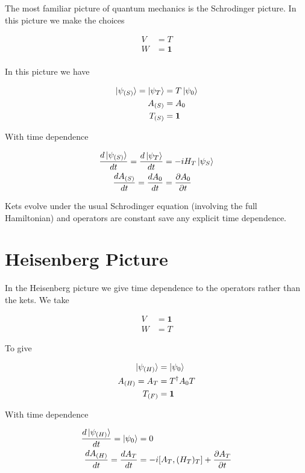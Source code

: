 \documentclass[12pt]{article}
\newcommand{\ddt}[1]{\frac{d #1}{dt}}
\newcommand{\ppt}[1]{\frac{\partial #1}{\partial t}}
\newcommand{\bv}[1]{\boldsymbol{#1}}
\begin{document}
The most familiar picture of quantum mechanics is the Schrodinger picture. In this picture we make the choices

\begin{align}
V &= T\\
W &= \bv{1}\\
\end{align}

In this picture we have

\begin{align}
\ket{\psi_{(S)}} = \ket{\psi_T} &= T \ket{\psi_0}\\
A_{(S)} &= A_0\\
T_{(S)} &= \bv{1}
\end{align}

With time dependence

\begin{align}
\ddt{\ket{\psi_{(S)}}} = \ddt{\ket{\psi_T}} &= -i H_T \ket{\psi_S}\\
\ddt{A_{(S)}} = \ddt{A_0} &= \ppt{A_0}
\end{align}

Kets evolve under the usual Schrodinger equation (involving the full Hamiltonian) and operators are constant save any explicit time dependence.

\section{Heisenberg Picture}

In the Heisenberg picture we give time dependence to the operators rather than the kets. We take

\begin{align}
V &= \bv{1}\\
W &= T
\end{align}

To give

\begin{align}
\ket{\psi_{(H)}} &= \ket{\psi_0}\\
A_{(H)} = A_T &= T^{\dag} A_0 T\\
T_{(F)} &= \bv{1}
\end{align}

With time dependence

\begin{align}
\ddt{\ket{\psi_{(H)}}} = \ket{\psi_0} &= 0\\
\ddt{A_{(H)}} = \ddt{A_T} &= -i[A_T,(H_T)_T] + \ppt{A_T}
\end{align}
\end{document}
